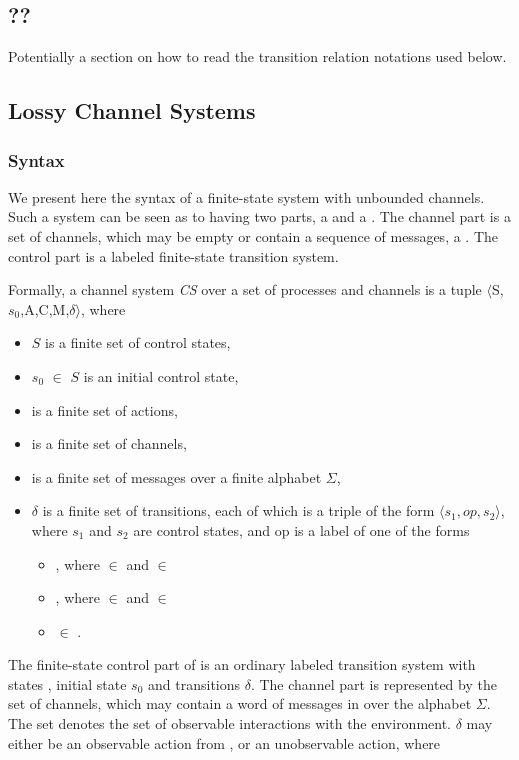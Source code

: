 \subsection{??}
Potentially a section on how to read the transition relation notations used below.

\subsection{Lossy Channel Systems}
\subsubsection{Syntax}
We present here the syntax of a finite-state system with unbounded channels. Such a system can be seen as to having two parts, a  and a . The channel part is a set of channels, which may be empty or contain a sequence of messages, a . The control part is a labeled finite-state transition system.

\label{CS}
Formally, a channel system \emph{CS} over a set of processes  and channels  is a tuple $\langle$S,$s_0$,A,C,M,$\delta$$\rangle$, where
\begin{itemize}
\item[]
$S$ is a finite set of control states,
\item[]
$s_0$ $\in$ $S$ is an initial control state,
\item[]
 is a finite set of actions,
\item[]
 is a finite set of channels,
\item[]
 is a finite set of messages over a finite alphabet $\Sigma$,
\item[]
$\delta$ is a finite set of transitions, each of which is a triple of the form $\langle s_1,op,s_2\rangle$, where $s_1$ and $s_2$ are control states, and op is a label of one of the forms

\begin{itemize}
\item
{}, where  $\in$  and  $\in$ 
\item
{}, where  $\in$  and  $\in$ 
\item
{} $\in$ .
\end{itemize}
\end{itemize}

The finite-state control part of  is an ordinary labeled transition system with states , initial state $s_0$ and transitions $\delta$. The channel part is represented by the set  of channels, which may contain a word of messages in  over the alphabet $\Sigma$. The set  denotes the set of observable interactions with the environment. $\delta$ may either be an observable action from , or an unobservable action, where

